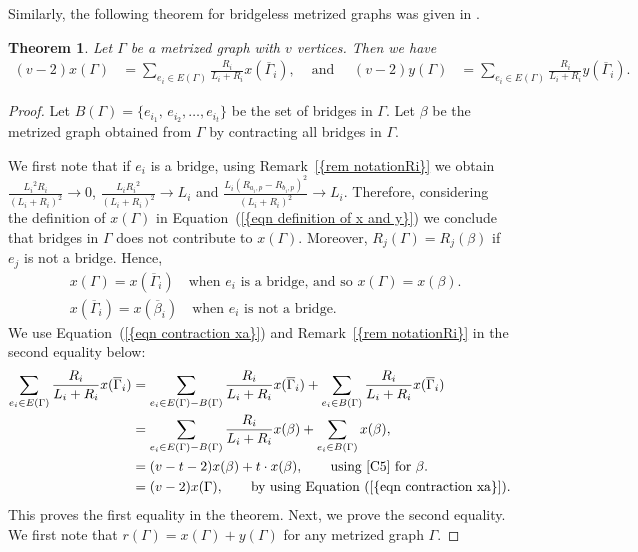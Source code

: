 \documentclass[12pt]{amsart}
\newtheorem{theorem}{Theorem}[section]
\theoremstyle{example}
\theoremstyle{definition}
\theoremstyle{notation}
\begin{document}
Similarly, the following theorem for bridgeless metrized graphs was given in \cite[Theorem 4.12]{C5}.
\begin{theorem}\label{thm contraction}
Let ${\Gamma}$ be a metrized graph with $v$ vertices. Then we have
\begin{align*}
(v-2) x({\Gamma}) &=\sum_{e_i \in {E({\Gamma})}}\frac{R_{i}}{{L_{i}}+{R_{i}}}x({{\overline{\Gamma}}}_i), & \text{  and   } \quad
(v-2) y({\Gamma}) &=\sum_{e_i \in {E({\Gamma})}}\frac{R_{i}}{{L_{i}}+{R_{i}}}y({{\overline{\Gamma}}}_i).
\end{align*}
\end{theorem}
\begin{proof}
Let $B({\Gamma})=\{ e_{i_1}, \, e_{i_2}, \dots, e_{i_t}  \}$ be the set of bridges in ${\Gamma}$.
Let $\beta$ be the metrized graph obtained from ${\Gamma}$ by contracting all bridges in ${\Gamma}$.

We first note that if $e_i$ is a bridge, using {Remark~\ref{{rem notationRi}}} we obtain
$\frac{{L_{i}}^2{R_{i}}}{({L_{i}}+{R_{i}})^2} \longrightarrow 0$, $\frac{{L_{i}} {R_{i}}^2}{({L_{i}}+{R_{i}})^2} \longrightarrow {L_{i}}$
and $\frac{{L_{i}}(R_{a_i,p}-R_{b_i,p})^2}{({L_{i}}+{R_{i}})^2} \longrightarrow {L_{i}}$. Therefore, considering the definition of $x({\Gamma})$ in {Equation~(\ref{{eqn definition of x and y}})} we conclude that bridges in ${\Gamma}$ does not contribute to $x({\Gamma})$. Moreover, $R_j({\Gamma})=R_j(\beta)$ if $e_j$ is not a bridge. Hence,
\begin{equation}\label{eqn contraction xa}
\begin{split}
&x({\Gamma})=x({{\overline{\Gamma}}}_i) \quad \text{when $e_i$ is a bridge, and so  }    x({\Gamma})=x(\beta).\\
&x({{\overline{\Gamma}}}_i)=x(\overline{\beta}_i) \quad \text{when $e_i$ is not a bridge}.
\end{split}
\end{equation}
We use {Equation~(\ref{{eqn contraction xa}})} and {Remark~\ref{{rem notationRi}}} in the second equality below:
\begin{equation}\label{eqn contraction xb}
\begin{split}
\sum_{e_i \in {E({\Gamma})}} \frac{R_{i}}{ {L_{i}} + {R_{i}} } x({{\overline{\Gamma}}}_i) & = \sum_{e_i \in {E({\Gamma})}-B({\Gamma})} \frac{R_{i}}{ {L_{i}} + {R_{i}} } x({{\overline{\Gamma}}}_i)+\sum_{e_i \in B({\Gamma})} \frac{R_{i}}{ {L_{i}} + {R_{i}} } x({{\overline{\Gamma}}}_i) \\
& = \sum_{e_i \in {E({\Gamma})}-B({\Gamma})} \frac{R_{i}}{ {L_{i}} + {R_{i}} } x(\beta)+\sum_{e_i \in B({\Gamma})} x(\beta), \\
&=(v-t-2) x(\beta)+t\cdot x(\beta), \qquad \text{using \cite[Theorem 4.12]{C5} for $\beta$.} \\
&=(v-2) x({\Gamma}), \qquad \text{by using {Equation~(\ref{{eqn contraction xa}})}}.
\end{split}
\end{equation}
This proves the first equality in the theorem. Next, we prove the second equality.
We first note that $r({\Gamma})=x({\Gamma})+y({\Gamma})$ for any metrized graph ${\Gamma}$.


\end{proof}
\end{document}
